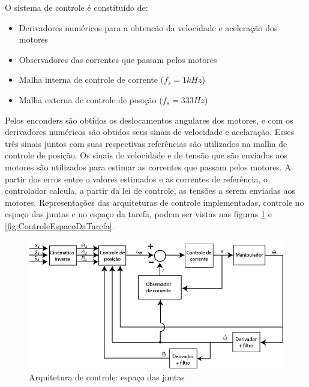 \documentclass[]{politex}
\begin{document}
O sistema de controle é constituído de: 
\begin{itemize}
\item Derivadores numéricos para a obtencão da velocidade e aceleração dos motores
\item Observadores das correntes que passam pelos motores
\item Malha interna de controle de corrente ($f_s = 1kHz$)
\item Malha externa de controle de posição ($f_s = 333Hz$)
\end{itemize} 

Pelos enconders são obtidos os deslocamentos angulares dos motores, e com os derivadores numéricos são obtidos seus sinais de velocidade e acelaração. Esses três sinais juntos com suas respectivas referências são utilizados na malha de controle de posição. Os sinais de velocidade e de tensão que são enviados aos motores são utilizados para estimar as correntes que passam pelos motores. A partir dos erros entre o valores estimados e as correntes de referência, o controlador calcula, a partir da lei de controle, as tensões a serem enviadas aos motores. Representações das arquiteturas de controle implementadas, controle no espaço das juntas e no espaço da tarefa, podem ser vistas nas figuras \ref{fig:ControleEspacoDasJuntas} e \ref{fig:ControleEspacoDaTarefa}.

\begin{figure}[H]
    \centering
    \includegraphics[scale=0.5]{imagens/ControleEspacoDasJuntas.png}
    \caption{Arquitetura de controle: espaço das juntas}
    \label{fig:ControleEspacoDasJuntas}
\end{figure}
\end{document}
